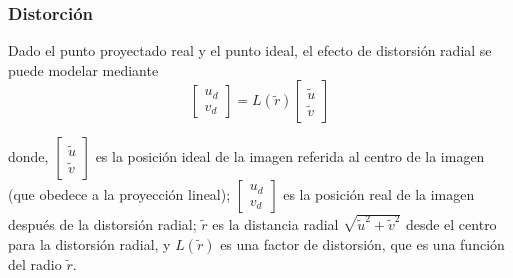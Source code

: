 \begin{frame}
	\frametitle{Distorción}
	
	\footnotesize
	
	Dado el punto proyectado real y el punto ideal, el efecto de distorsión radial se puede modelar mediante
	\begin{equation}
		\begin{bmatrix}u_{d}\\
			v_{d}
		\end{bmatrix}=L(\tilde{r})\begin{bmatrix}\tilde{u}\\
			\tilde{v}
		\end{bmatrix}
	\end{equation}
	
	donde, 
	$\begin{bmatrix}\tilde{u}\\ 
		\tilde{v}
	\end{bmatrix}$
	es la posición ideal de la imagen referida al centro de la imagen (que obedece a la proyección lineal);
	$\begin{bmatrix}u_{d}\\
		v_{d}
	\end{bmatrix} $
	es la posición real de la imagen después de la distorsión radial; $\tilde{r}$ es la distancia radial $\sqrt{\tilde{u}^{2}+\tilde{v}^{2}}$ desde el centro para la distorsión radial, y $L(\tilde{r})$ es una factor de distorsión, que es una función del radio $\tilde{r}$.
\end{frame}

